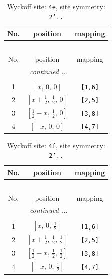 \documentclass[fleqn,8pt]{jsarticle}
\begin{document}
\begin{longtable}{ccc}
\caption{Wyckoff site: {\tt 4e}, site symmetry: {\tt 2'..}}
 \\
 \hline \hline
No. & position & mapping \\ \hline \endfirsthead

\multicolumn{2}{l}{\tablename\ \thetable{}} \\
 \hline \hline
No. & position & mapping \\ \hline \endhead

 \hline \hline
\multicolumn{2}{r}{\footnotesize\it continued ...} \\ \endfoot

 \hline \hline
\multicolumn{2}{r}{} \\ \endlastfoot

1 & $\left[ x,\, 0,\, 0 \right]$ & {\tt [1,6]} \\ \hline
2 & $\left[ x + \frac{1}{2},\, \frac{1}{2},\, 0 \right]$ & {\tt [2,5]} \\ \hline
3 & $\left[ \frac{1}{2} - x,\, \frac{1}{2},\, 0 \right]$ & {\tt [3,8]} \\ \hline
4 & $\left[ - x,\, 0,\, 0 \right]$ & {\tt [4,7]} \\
\end{longtable}
\renewcommand{\arraystretch}{1.2}
\begin{longtable}{ccc}
\caption{Wyckoff site: {\tt 4f}, site symmetry: {\tt 2'..}}
 \\
 \hline \hline
No. & position & mapping \\ \hline \endfirsthead

\multicolumn{2}{l}{\tablename\ \thetable{}} \\
 \hline \hline
No. & position & mapping \\ \hline \endhead

 \hline \hline
\multicolumn{2}{r}{\footnotesize\it continued ...} \\ \endfoot

 \hline \hline
\multicolumn{2}{r}{} \\ \endlastfoot

1 & $\left[ x,\, 0,\, \frac{1}{2} \right]$ & {\tt [1,6]} \\ \hline
2 & $\left[ x + \frac{1}{2},\, \frac{1}{2},\, \frac{1}{2} \right]$ & {\tt [2,5]} \\ \hline
3 & $\left[ \frac{1}{2} - x,\, \frac{1}{2},\, \frac{1}{2} \right]$ & {\tt [3,8]} \\ \hline
4 & $\left[ - x,\, 0,\, \frac{1}{2} \right]$ & {\tt [4,7]} \\
\end{longtable}
\end{document}
